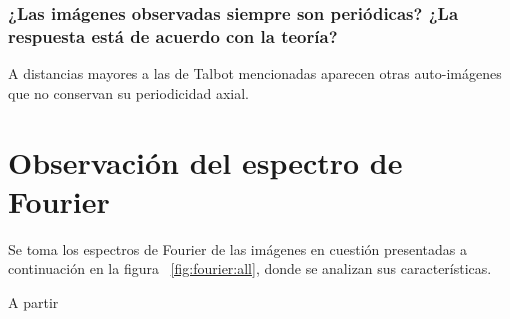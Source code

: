 \documentclass{./packages/optica-article}
\begin{document}
\subsubsection{ ¿Las imágenes observadas siempre son periódicas? ¿La respuesta está de acuerdo con la teoría?}
	
    A distancias mayores a las de Talbot mencionadas aparecen otras auto-imágenes que no conservan su periodicidad axial.







\section{Observación del espectro de Fourier}
Se toma los espectros de Fourier de las imágenes en cuestión presentadas a continuación en la figura ~\ref{fig:fourier:all}, donde se analizan sus características.

A partir
\end{document}
